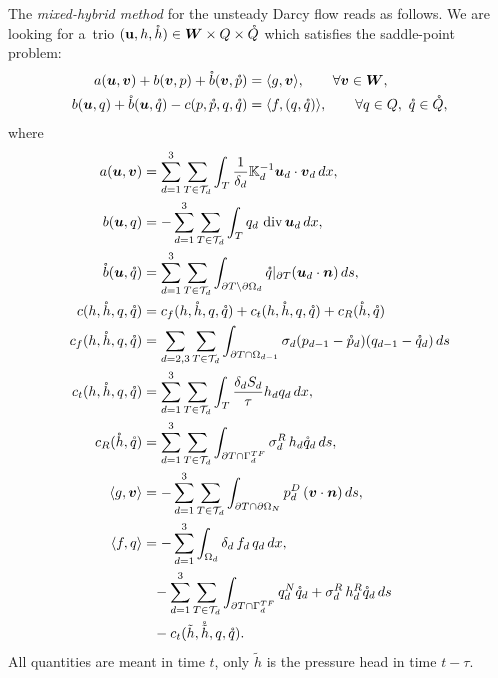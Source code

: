 The \emph{mixed-hybrid method} for the unsteady Darcy flow reads as follows.
We are looking for a~trio $(\mathbf{u},h,\mathring h)  
\in \mathbf{\boldsymbol{W}}\times Q\times\mathring Q$ which satisfies the saddle-point problem:
\begin{align}
    a(\vc u,\vc v)  +b(\vc v, p) + \mr b(\vc v, \mr p)
        &=\langle g,\vc v \rangle, \qquad\forall \vc v\in \vc W,
        \label{eq:hybrid-frac-1}\\
    b(\vc u, q ) + \mr b( \vc u, \mr q) - c(p, \mr p, q, \mr q)
        &= \langle f, (q,\mr q) \rangle,
        \qquad\forall q\in Q,\ \mr q\in \mr Q, 
        \label{eq:hybrid-frac-2}
\end{align}
where
\begin{align}
    \label{eq:weak_term_a}
    a(\vc u, \vc v) &= \sum_{d=1}^{3}\sum_{T\in \mathcal T_d}
    \int_{T} \frac{1}{\delta_{d}}\tn K_{d}^{-1} 
    \vc u_d\cdot \vc v_d\,dx,
    \\
    \label{eq:weak_term_b}
    b(\vc u, q)  &= -\sum_{d=1}^{3}\sum_{T\in \mathcal T_d}
    \int_{T} q_d\,\div \vc u_d\,dx,
    \\
    \label{eq:weak_term_bf}
    \mr b(\vc u, \mr q)   &= \sum_{d=1}^{3}\sum_{T\in \mathcal T_d}
    \int_{\partial T\setminus\partial\Omega_{d}}
        \mr q|_{\partial T} ( \vc u_d\cdot\vc n)\,ds,
    \\
    \label{eq:weak_term c}
    c(h, \mr h, q, \mr q) &= c_f(h, \mr h, q, \mr q) 
    + c_t(h, \mr h, q, \mr q) + c_R(\mr h, \mr q)
    \\
    c_f(h, \mr h, q, \mr q)&=\sum_{d=2,3}\sum_{T\in \mathcal T_d}
        \int_{\partial T \cap\Omega_{d-1}} \sigma_{d} 
        (p_{d-1} - \mr p_d)(q_{d-1} - \mr q_d)\,ds
    \\
    c_t(h, \mr h, q, \mr q)&= \sum_{d=1}^{3}\sum_{T\in \mathcal T_d}
        \int_{T} \frac{\delta_d S_d}{\tau} h_d q_d\,dx,
    \\    
    c_R(\mr h, \mr q)&= \sum_{d=1}^{3}\sum_{T\in \mathcal T_d}
    \int_{\partial T\cap\Gamma_{d}^{TF}}
        \sigma_d^R\, h_d \mr q_d \,ds,
    \\
    \langle g, \vc v \rangle  & =
    -\sum_{d=1}^{3}\sum_{T\in\mathcal T_d}
    \int_{\partial T\cap\partial\Omega_N} 
        p_d^D\, (\vc v \cdot \vc n)  \,ds,
    \\
    \langle f, q \rangle  &=
    -\sum_{d=1}^{3}\int_{\Omega_d} \delta_{d}\,f_d\,q_{d}\,dx,
    \\
        &\phantom{=}-
    \sum_{d=1}^{3}\sum_{T\in\mathcal T_d}
    \int_{\partial T\cap\Gamma_d^{TF}} 
        q_d^N \mr q_d + \sigma_d^R\, h_d^R \mr q_d\,ds
    \\
        &\phantom{=}-c_t(\tilde h, \mr{\tilde{h}}, q, \mr q).
    \label{eq:weak_term_f}%
\end{align}
All quantities are meant in time $t$, only $\tilde h$ is the pressure head in time $t-\tau$.

